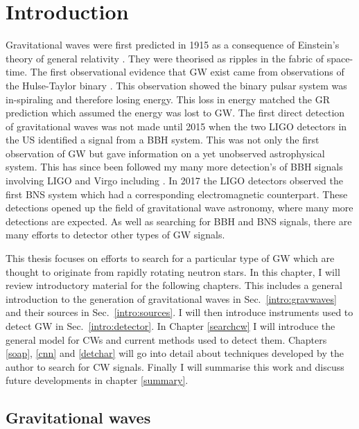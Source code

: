 \chapter{Introduction}


Gravitational waves were first predicted in 1915 as a consequence of Einstein's theory of general relativity \citep{}.
They were theorised as ripples in the fabric of space-time.
The first observational evidence that \ac{GW} exist came from observations of the Hulse-Taylor binary \citep{Weisberg1981GravitationalPulsar,Weisberg2004RelativisticAnalysis}. 
This observation showed the binary pulsar system was in-spiraling and therefore losing energy.
This loss in energy matched the \ac{GR} prediction which assumed the energy was lost to \ac{GW}.
The first direct detection of gravitational waves was not made until 2015 when the two \ac{LIGO} detectors in the US \citep{Abbott2016e} identified a signal from a \ac{BBH} system.
This was not only the first observation of \ac{GW} but gave information on a yet unobserved astrophysical system.
This has since been followed my many more detection's of \ac{BBH} signals involving \ac{LIGO} and Virgo including \citep{Abbott2017b,Abbott2019}.
In 2017 the \ac{LIGO} detectors observed the first \ac{BNS} system \citep{Abbott2017a} which had a corresponding electromagnetic counterpart.
These detections opened up the field of gravitational wave astronomy, where many more detections are expected.
As well as searching for \ac{BBH} and \ac{BNS} signals, there are many efforts to detector other types of \ac{GW} signals. 


This thesis focuses on efforts to search for a particular type of \ac{GW} which are thought to originate from rapidly rotating neutron stars.
In this chapter, I will review introductory material for the following chapters. 
This includes a general introduction to the generation of gravitational waves in Sec.~\ref{intro:gravwaves} and their sources in Sec.~\ref{intro:sources}.
I will then introduce instruments used to detect \ac{GW} in Sec.~\ref{intro:detector}.
In Chapter \ref{searchcw} I will introduce the general model for \acp{CW} and current methods used to detect them.
Chapters \ref{soap}, \ref{cnn} and \ref{detchar} will go into detail about techniques developed by the author to search for \ac{CW} signals. 
Finally I will summarise this work and discuss future developments in chapter \ref{summary}.


\section{\label{intro:gravwaves}Gravitational waves}

